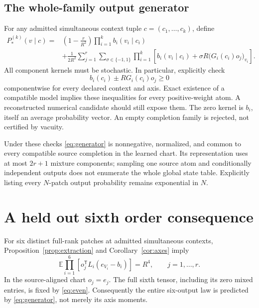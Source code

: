 \documentclass[11pt]{article}
\theoremstyle{definition}
\theoremstyle{remark}
\newcommand{\E}{\mathbb E}
\newcommand{\trans}{\mathsf T}
\begin{document}
\subsection{The whole-family output generator}

For any admitted simultaneous context tuple $c=(c_1,\ldots,c_k)$, define
\begin{align}
P_*^{(k)}(v\mid c)
={}&\left(1-\frac r{R^2}\right)
\prod_{i=1}^k b_i(v_i\mid c_i)\nonumber\\
&+\frac1{2R^2}\sum_{j=1}^r\sum_{\sigma\in\{-1,1\}}
\prod_{i=1}^k
\left[b_i(v_i\mid c_i)+\sigma R\bigl(G_i(c_i)o_j\bigr)_{v_i}\right].
\label{eq:generator}
\end{align}
All component kernels must be stochastic. In particular, explicitly check
\begin{equation}
b_i(c_i)\pm RG_i(c_i)o_j\ge0
\label{eq:atom-positivity}
\end{equation}
componentwise for every declared context and axis. Exact existence of a
compatible model implies these inequalities for every positive-weight
atom. A reconstructed numerical candidate should still expose them.
The zero kernel is $b_i$, itself an average probability vector. An empty
completion family is rejected, not certified by vacuity.

Under these checks \eqref{eq:generator} is nonnegative, normalized, and
common to every compatible source completion in the learned chart. Its
representation uses at most $2r+1$ mixture components; sampling one
source atom and conditionally independent outputs does not enumerate the
whole global state table. Explicitly listing every $N$-patch output
probability remains exponential in $N$.

\section{A held out sixth order consequence}
\label{sec:sixth}

For six distinct full-rank patches at admitted simultaneous contexts,
Proposition~\ref{prop:extraction} and Corollary~\ref{cor:axes} imply
\begin{equation}
\E\prod_{i=1}^6
\left[o_j^\trans L_i(e_{V_i}-b_i)\right]=R^4,
\qquad j=1,\ldots,r.
\label{eq:six-view}
\end{equation}
In the source-aligned chart $o_j=e_j$. The full sixth tensor, including its
zero mixed entries, is fixed by \eqref{eq:even}. Consequently the entire
six-output law is predicted by \eqref{eq:generator}, not merely its axis
moments.
\end{document}
